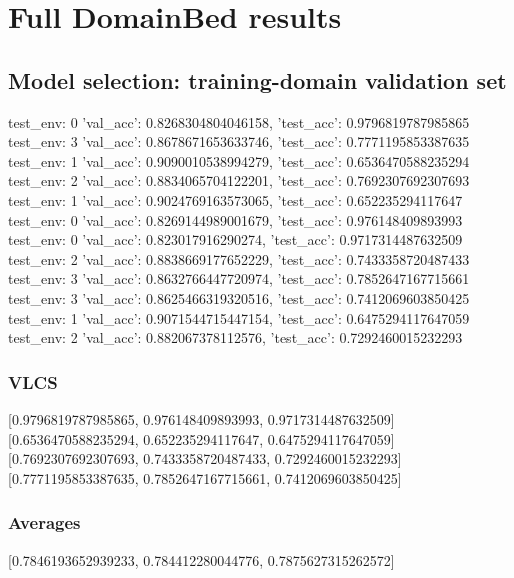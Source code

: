 \documentclass{article}
\begin{document}
\section{Full DomainBed results}

\subsection{Model selection: training-domain validation set}
test_env: 0
{'val_acc': 0.8268304804046158, 'test_acc': 0.9796819787985865}
test_env: 3
{'val_acc': 0.8678671653633746, 'test_acc': 0.7771195853387635}
test_env: 1
{'val_acc': 0.9090010538994279, 'test_acc': 0.6536470588235294}
test_env: 2
{'val_acc': 0.8834065704122201, 'test_acc': 0.7692307692307693}
test_env: 1
{'val_acc': 0.9024769163573065, 'test_acc': 0.652235294117647}
test_env: 0
{'val_acc': 0.8269144989001679, 'test_acc': 0.976148409893993}
test_env: 0
{'val_acc': 0.823017916290274, 'test_acc': 0.9717314487632509}
test_env: 2
{'val_acc': 0.8838669177652229, 'test_acc': 0.7433358720487433}
test_env: 3
{'val_acc': 0.8632766447720974, 'test_acc': 0.7852647167715661}
test_env: 3
{'val_acc': 0.8625466319320516, 'test_acc': 0.7412069603850425}
test_env: 1
{'val_acc': 0.9071544715447154, 'test_acc': 0.6475294117647059}
test_env: 2
{'val_acc': 0.882067378112576, 'test_acc': 0.7292460015232293}

\subsubsection{VLCS}
[0.9796819787985865, 0.976148409893993, 0.9717314487632509]
[0.6536470588235294, 0.652235294117647, 0.6475294117647059]
[0.7692307692307693, 0.7433358720487433, 0.7292460015232293]
[0.7771195853387635, 0.7852647167715661, 0.7412069603850425]

\begin{center}
\end{center}

\subsubsection{Averages}
[0.7846193652939233, 0.784412280044776, 0.7875627315262572]

\begin{center}
\end{center}
\end{document}
